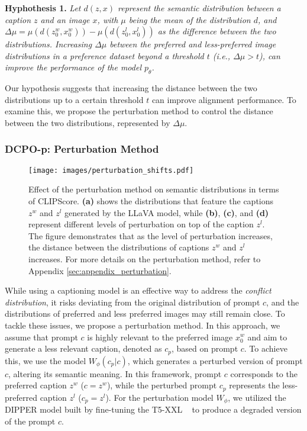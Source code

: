 \textbf{Hyphothesis 1.} \textit{Let \( d(z, x) \) represent the semantic distribution between a caption \( z \) and an image \( x \), with \( \mu \) being the mean of the distribution \( d \), and \( \Delta \mu = \mu(d(z_0^w, x_0^w)) - \mu(d(z_0^l, x_0^l)) \) as the difference between the two distributions. Increasing \( \Delta \mu \) between the preferred and less-preferred image distributions in a preference dataset beyond a threshold \( t \) (i.e., \( \Delta \mu > t \)), can improve the performance of the model \( p_\theta \).}

Our hypothesis suggests that increasing the distance between the two distributions up to a certain threshold \( t \) can improve alignment performance. To examine this, we propose the perturbation method to control the distance between the two distributions, represented by \(\Delta \mu\).

\subsubsection{DCPO-p: Perturbation Method}
\label{sec:dcpo-p}

\begin{figure}[t]
    \centering
    
    \texttt{[image: images/perturbation\_shifts.pdf]}
    \vspace{-2em}
    \caption{Effect of the perturbation method on semantic distributions in terms of CLIPScore. \textbf{(a)} shows the distributions that feature the captions \( z^w \) and \( z^l \) generated by the LLaVA model, while \textbf{(b)}, \textbf{(c)}, and \textbf{(d)} represent different levels of perturbation on top of the caption \( z^l \). The figure demonstrates that as the level of perturbation increases, the distance between the distributions of captions \( z^w \) and \( z^l \) increases. For more details on the perturbation method, refer to Appendix \ref{sec:appendix_perturbation}.}
    \vspace{-.5em}
    \label{fig:perturbation-clipscore}
\end{figure}

While using a captioning model is an effective way to address the \textit{conflict distribution}, it risks deviating from the original distribution of prompt \( c \), and the distributions of preferred and less preferred images may still remain close. To tackle these issues, we propose a perturbation method. In this approach, we assume that prompt \( c \) is highly relevant to the preferred image \( x_0^w \) and aim to generate a less relevant caption, denoted as \( c_p \), based on prompt \( c \). To achieve this, we use the model \( W_{\phi}(c_p|c) \), which generates a perturbed version of prompt \( c \), altering its semantic meaning. In this framework, prompt \( c \) corresponds to the preferred caption \( z^w \) (\(c = z^w\)), while the perturbed prompt \( c_p \) represents the less-preferred caption \( z^l \) (\(c_p = z^l\)). For the perturbation model \( W_{\phi} \), we utilized the DIPPER model \citep{dipper} built by fine-tuning the T5-XXL  ~\citep{t5} to produce a degraded version of the prompt \( c \).


